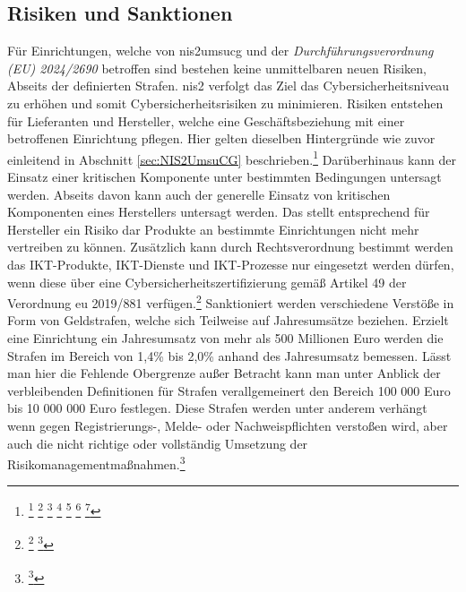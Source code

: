\documentclass[11pt,a4paper,hidelinks]{article}   %
\begin{document}
        \subsection{Risiken und Sanktionen}
        Für Einrichtungen, welche von \gls{nis2umsucg} und der \emph{Durchführungsverordnung (EU) 2024/2690} betroffen sind bestehen keine unmittelbaren neuen Risiken, Abseits der definierten Strafen. \gls{nis2} verfolgt das Ziel das Cyber­sicherheits­niveau zu erhöhen und somit Cybersicherheitsrisiken zu minimieren. Risiken entstehen für Lieferanten und Hersteller, welche eine Geschäftsbeziehung mit einer betroffenen Einrichtung pflegen. Hier gelten dieselben Hintergründe wie zuvor einleitend in Abschnitt \ref{sec:NIS2UmsuCG} beschrieben.\footnote{
            \footcite[Vgl.][, §30 Absatz 6]{NIS2UmsuCG}
            \footcite[Vgl.][, §56 Absatz 3]{NIS2UmsuCG}
            \footcite[Vgl.][, Anhang, Nummer 5.1.1. \& 5.1.2.]{EU2024-2690}
            \footcite[Vgl.][, Anhang, Nummer 5.1.4. \& 5.1.5.]{EU2024-2690}
            \footcite[Vgl.][, Anhang, Nummer 6.1.1. \& 6.1.2.]{EU2024-2690}
            \footcite[Vgl.][, Anhang, Nummer 6.1.1. \& 6.1.2.]{EU2024-2690}
            \footcite[Vgl.][, Anhang, Nummer 6.2.2 \& 6.2.3.]{EU2024-2690}
        } Darüberhinaus kann der Einsatz einer kritischen Komponente unter bestimmten Bedingungen untersagt werden. Abseits davon kann auch der generelle Einsatz von kritischen Komponenten eines Herstellers untersagt werden. Das stellt entsprechend für Hersteller ein Risiko dar Produkte an bestimmte Einrichtungen nicht mehr vertreiben zu können. Zusätzlich kann durch Rechtsverordnung bestimmt werden das IKT-Produkte, IKT-Dienste und IKT-Prozesse nur eingesetzt werden dürfen, wenn diese über eine Cybersicherheitszertifizierung gemäß Artikel 49 der Verordnung \gls{eu} 2019/881 verfügen.\footnote{
            \footcite[Vgl.][, §30, Absatz 6]{NIS2UmsuCG}
            \footcite[Vgl.][, §41]{NIS2UmsuCG}
        }\medbreak
        Sanktioniert werden verschiedene Verstöße in Form von Geldstrafen, welche sich Teilweise auf Jahresumsätze beziehen. Erzielt eine Einrichtung ein Jahresumsatz von mehr als 500 Millionen Euro werden die Strafen im Bereich von 1,4\% bis 2,0\% anhand des Jahresumsatz bemessen. Lässt man hier die Fehlende Obergrenze außer Betracht kann man unter Anblick der verbleibenden Definitionen für Strafen verallgemeinert den Bereich 100 000 Euro bis 10 000 000 Euro festlegen. Diese Strafen werden unter anderem verhängt wenn gegen Registrierungs-, Melde- oder Nachweispflichten verstoßen wird, aber auch die nicht richtige oder vollständig Umsetzung der Risikomanagementmaßnahmen.\footnote{
            \footcite[Vgl.][, §65]{NIS2UmsuCG}
        }
\end{document}
